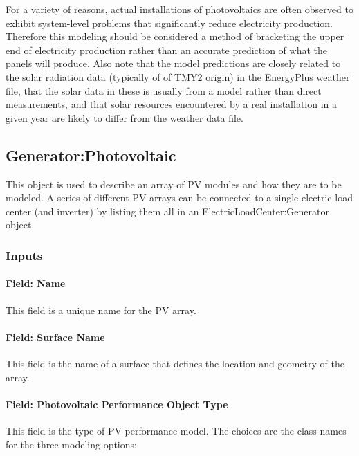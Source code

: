 For a variety of reasons, actual installations of photovoltaics are often observed to exhibit system-level problems that significantly reduce electricity production. Therefore this modeling should be considered a method of bracketing the upper end of electricity production rather than an accurate prediction of what the panels will produce. Also note that the model predictions are closely related to the solar radiation data (typically of of TMY2 origin) in the EnergyPlus weather file, that the solar data in these is usually from a model rather than direct measurements, and that solar resources encountered by a real installation in a given year are likely to differ from the weather data file.

\subsection{Generator:Photovoltaic}\label{generatorphotovoltaic-000}

This object is used to describe an array of PV modules and how they are to be modeled. A series of different PV arrays can be connected to a single electric load center (and inverter) by listing them all in an ElectricLoadCenter:Generator object.

\subsubsection{Inputs}\label{inputs-20-000}

\paragraph{Field: Name}\label{field-name-23}

This field is a unique name for the PV array.

\paragraph{Field: Surface Name}\label{field-surface-name-001}

This field is the name of a surface that defines the location and geometry of the array.

\paragraph{Field: Photovoltaic Performance Object Type}\label{field-photovoltaic-performance-object-type}

This field is the type of PV performance model. The choices are the class names for the three modeling options:

